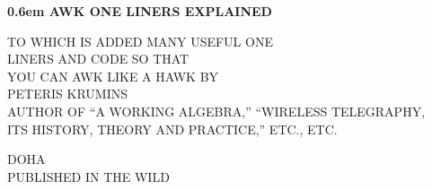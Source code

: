 \documentclass{book}
\begin{document}
\clearpage
\newcommand\nbvspace[1][3]{\vspace*{\stretch{#1}}}
\newcommand\nbstretchyspace{\spaceskip0.5em plus 0.25em minus 0.25em}
\newcommand{\nbtitlestretch}{\spaceskip0.6em}
\pagestyle{empty}
\begin{center}
\bfseries
\nbvspace[1]
\Huge
{\nbtitlestretch\huge
AWK ONE LINERS EXPLAINED}

\nbvspace[1]
\normalsize

TO WHICH IS ADDED MANY USEFUL ONE\\
LINERS AND CODE SO THAT\\
YOU CAN AWK LIKE A HAWK
\nbvspace[1]
\small BY\\
\Large PETERIS KRUMINS\\[0.5em]
\footnotesize AUTHOR OF ``A WORKING ALGEBRA,'' ``WIRELESS TELEGRAPHY,\\
ITS HISTORY, THEORY AND PRACTICE,'' ETC., ETC.

\nbvspace[2]


\nbvspace[3]
\normalsize

DOHA\\
\large
PUBLISHED IN THE WILD
\nbvspace[1]
\end{center}
\end{document}
